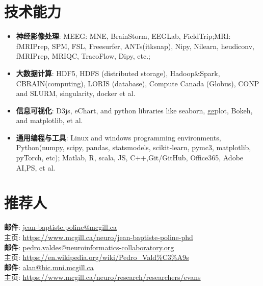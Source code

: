 \documentclass{resume}
\begin{document}
\section{技术能力}
\begin{itemize}[parsep=0.2ex]
  \item \textbf{神经影像处理}: MEEG: MNE, BrainStorm, EEGLab, FieldTrip;MRI: fMRIPrep, SPM, FSL, Freesurfer, ANTs(itksnap), Nipy, Nilearn, heudiconv, fMRIPrep, MRIQC, TracoFlow, Dipy, etc.;
  \item \textbf{大数据计算}: HDF5, HDFS (distributed storage), Hadoop\&Spark, CBRAIN(computing), LORIS (database), Compute Canada (Globus), CONP and SLURM, singularity, docker et al.
  \item \textbf{信息可视化}: D3js, eChart, and python libraries like seaborn, ggplot, Bokeh, and matplotlib, et al.
  \item \textbf{通用编程与工具}: Linux and windows programming environments, Python(numpy, scipy, pandas, statsmodels, scikit-learn, pymc3, matplotlib, pyTorch, etc); Matlab, R, scala, JS, C++,Git/GitHub, Office365, Adobe AI,PS, et al.
\end{itemize}

\section{推荐人}
\textbf{邮件}: \href{jean-baptiste.poline@mcgill.ca}{jean-baptiste.poline@mcgill.ca}\\
主页: \href{https://www.mcgill.ca/neuro/jean-baptiste-poline-phd}{https://www.mcgill.ca/neuro/jean-baptiste-poline-phd}\\

\textbf{邮件}: \href{pedro.valdes@neuroinformatics-collaboratory.org}{pedro.valdes@neuroinformatics-collaboratory.org}\\
主页: \href{https://en.wikipedia.org/wiki/Pedro\_Vald\%C3\%A9s}{https://en.wikipedia.org/wiki/Pedro\_Vald\%C3\%A9s}\\

\textbf{邮件}: \href{alan@bic.mni.mcgill.ca}{alan@bic.mni.mcgill.ca}\\
主页: \href{https://www.mcgill.ca/neuro/research/researchers/evans}{https://www.mcgill.ca/neuro/research/researchers/evans}\\

%
%
\end{document}
